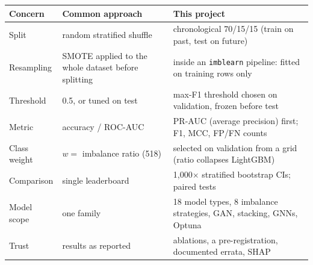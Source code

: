 \documentclass[11pt,a4paper]{article}
\begin{document}
{\footnotesize
\begin{center}
\begin{tabular}{@{}lP{4.6cm}P{7.2cm}@{}}
\toprule
Concern & Common approach & This project \\
\midrule
Split & random stratified shuffle & chronological 70/15/15 (train on past, test on future) \\
Resampling & SMOTE applied to the whole dataset before splitting & inside an \texttt{imblearn} pipeline: fitted on training rows only \\
Threshold & 0.5, or tuned on test & max-F1 threshold chosen on validation, frozen before test \\
Metric & accuracy / ROC-AUC & PR-AUC (average precision) first; F1, MCC, FP/FN counts \\
Class weight & $w=$ imbalance ratio (518) & selected on validation from a grid (ratio collapses LightGBM) \\
Comparison & single leaderboard & 1,000$\times$ stratified bootstrap CIs; paired tests \\
Model scope & one family & 18 model types, 8 imbalance strategies, GAN, stacking, GNNs, Optuna \\
Trust & results as reported & ablations, a pre-registration, documented errata, SHAP \\
\bottomrule
\end{tabular}
\end{center}
}

\end{document}

